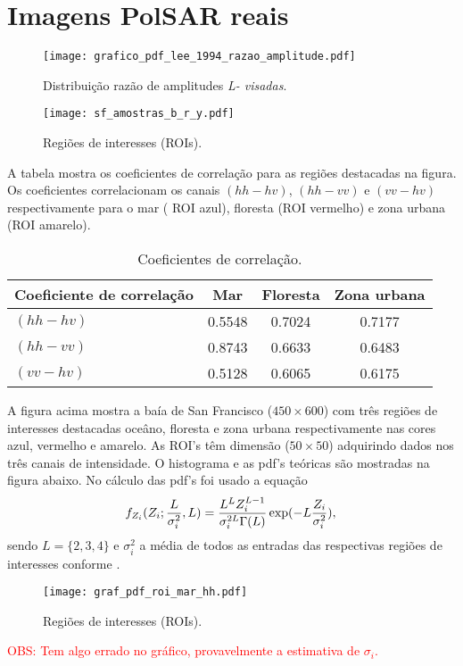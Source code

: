 \section{Imagens PolSAR reais}
\begin{figure}[hbt]
\centering
\texttt{[image: grafico\_pdf\_lee\_1994\_razao\_amplitude.pdf]}
	\caption{Distribuição razão de amplitudes {\it L- visadas}.}
\label{fig2}
\end{figure}
\begin{figure}[hbt]
\centering
	\texttt{[image: sf\_amostras\_b\_r\_y.pdf]}
	\vspace{-2.5cm}
	\caption{Regiões de interesses (ROIs).}
\label{fig2}
\end{figure}
 A tabela mostra os coeficientes de correlação para as regiões destacadas na figura. Os coeficientes correlacionam os canais $(hh-hv)$, $(hh-vv)$ e $(vv-hv)$ respectivamente para o mar ( ROI azul), floresta (ROI vermelho) e zona urbana (ROI amarelo).
\begin{table}[hbt]
	\centering
	\caption{Coeficientes de correlação.}\label{cap_acf_tab04}
\begin{tabular}{@{}lccc@{}} \toprule
	Coeficiente de correlação & Mar  & Floresta & Zona urbana \\ \midrule
	$(hh-hv)$ & 0.5548 & 0.7024 &  0.7177 \\ 
	$(hh-vv)$ & 0.8743 & 0.6633 &  0.6483\\ 
	$(vv-hv)$ & 0.5128 & 0.6065 &  0.6175\\ \bottomrule
\end{tabular}
\end{table}

A figura acima mostra a baía de San Francisco ($450 \times 600$) com três regiões de interesses destacadas oceâno, floresta e zona urbana respectivamente nas cores azul, vermelho e amarelo. As ROI's têm dimensão ($50 \times 50$) adquirindo dados nos três canais de intensidade. O histograma e as pdf's teóricas são mostradas na figura abaixo. No cálculo das pdf's foi usado a equação 
\begin{equation}\label{cap_acf_23}
	f_{Z_{i}}(Z_{i};\frac{L}{\sigma_{i}^2},L)=\frac{L^{L}Z_{i}^{L-1}}{\sigma_{i}^{2L}\Gamma(L)} \exp(-L\frac{Z_{i}}{\sigma_{i}^2}), \\
\end{equation}
sendo $L=\{2,3,4\}$ e $\sigma_{i}^2$ a média de todos as entradas das respectivas regiões de interesses conforme \cite{nhfc}.

\begin{figure}[hbt]
\centering
	\texttt{[image: graf\_pdf\_roi\_mar\_hh.pdf]}
	\caption{Regiões de interesses (ROIs).}
\label{fig2}
\end{figure}
\textcolor{red}{OBS: Tem algo errado no gráfico, provavelmente a estimativa de $\sigma_{i}$.}

